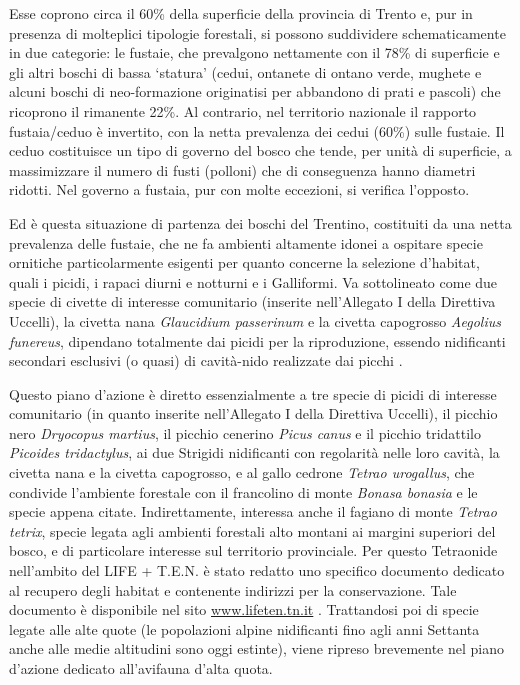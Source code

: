 \documentclass[10pt,twoside,openany,x11names,svgnames,italian,a5paper,dvipsnames,table]{memoir}
\begin{document}
Esse coprono circa il 60\% della superficie della provincia di Trento e, pur in presenza di molteplici tipologie forestali, si possono suddividere schematicamente in due categorie: le fustaie, che prevalgono nettamente con il 78\% di superficie e gli altri boschi di bassa ‘statura’ (cedui, ontanete di ontano verde, mughete e alcuni boschi di neo-formazione originatisi per abbandono di prati e pascoli) che ricoprono il rimanente 22\%. Al contrario, nel territorio nazionale il rapporto fustaia/ceduo è invertito, con la netta prevalenza dei cedui (60\%) sulle fustaie. Il ceduo costituisce un tipo di governo del bosco che tende, per unità di superficie, a massimizzare il numero di fusti (polloni) che di conseguenza hanno diametri ridotti. Nel governo a fustaia, pur con molte eccezioni, si verifica l’opposto.

Ed è questa situazione di partenza dei boschi del Trentino, costituiti da una netta prevalenza delle fustaie, che ne fa ambienti altamente idonei a ospitare specie ornitiche particolarmente esigenti per quanto concerne la selezione d’habitat, quali i picidi, i rapaci diurni e notturni e i Galliformi. Va sottolineato come due specie di civette di interesse comunitario (inserite nell'Allegato I della Direttiva Uccelli), la civetta nana \emph{Glaucidium passerinum} e la civetta capogrosso \emph{Aegolius funereus}, dipendano totalmente dai picidi per la riproduzione, essendo nidificanti secondari esclusivi (o quasi) di cavità-nido realizzate dai picchi \cite{Cramp98}.

Questo piano d'azione è diretto essenzialmente a tre specie di picidi di interesse comunitario (in quanto inserite nell’Allegato I della Direttiva Uccelli), il picchio nero \emph{Dryocopus martius}, il picchio cenerino \emph{Picus canus} e il picchio tridattilo \emph{Picoides tridactylus}, ai due Strigidi nidificanti con regolarità nelle loro cavità, la civetta nana e la civetta capogrosso, e al gallo cedrone \emph{Tetrao urogallus}, che condivide l’ambiente forestale con il francolino di monte \emph{Bonasa bonasia} e le specie appena citate. Indirettamente, interessa anche il fagiano di monte \emph{Tetrao tetrix}, specie legata agli ambienti forestali alto montani ai margini superiori del bosco, e di particolare interesse sul territorio provinciale. Per questo Tetraonide nell’ambito del LIFE + T.E.N. è stato redatto uno specifico documento dedicato al recupero degli habitat e contenente indirizzi per la conservazione. Tale documento è disponibile nel sito \url{www.lifeten.tn.it} \cite{Rotelli14}. Trattandosi poi di specie legate alle alte quote (le popolazioni alpine nidificanti fino agli anni Settanta anche alle medie altitudini sono oggi estinte), viene ripreso brevemente nel piano d’azione dedicato all’avifauna d’alta quota.
\end{document}
